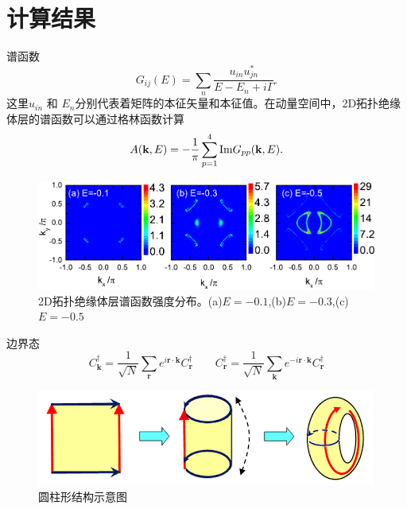 \documentclass[10pt,aspectratio=169]{beamer} %
\begin{document}
\section{计算结果}
\begin{frame}{谱函数}
	\begin{equation}
	G_{ij}(E)=\sum_n\frac{u_{in}u^{*}_{jn}}{E-E_n+i\Gamma}.
	\end{equation}
	这里$u_{in}$ 和 $E_n$分别代表着矩阵的本征矢量和本征值。在动量空间中，2D拓扑绝缘体层的谱函数可以通过格林函数计算
	\begin{equation}
	A({\bf k},E)=-\frac{1}{\pi}\sum^4_{p=1}\mathrm{Im} G_{pp}({\bf k},E).
	\end{equation}
\begin{figure}[h]
	\centering
	\includegraphics[scale=0.5]{pic/fig17.pdf}
	\caption{2D拓扑绝缘体层谱函数强度分布。(a)$E=-0.1$,(b)$E=-0.3$,(c)$E=-0.5$}\label{fig16}
\end{figure}
\end{frame}
\begin{frame}{边界态}
\begin{equation}
C^\dagger_\mathbf{k}=\frac{1}{\sqrt{N}}\sum_\mathbf{r}e^{i\mathbf{r}\cdot\mathbf{k}}C^\dagger_\mathbf{r}\qquad C^\dagger_\mathbf{r}=\frac{1}{\sqrt{N}}\sum_\mathbf{k}e^{-i\mathbf{r}\cdot\mathbf{k}}C^\dagger_\mathbf{r}
\end{equation}
\begin{figure}
\centering
\includegraphics[scale=0.6]{pic/fig16}
\caption{圆柱形结构示意图}\label{fig15}
\end{figure}
\end{frame}
\end{document}
